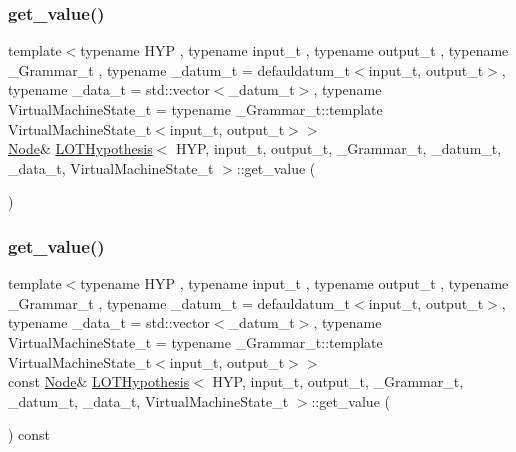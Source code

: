 \subsubsection{\texorpdfstring{get\+\_\+value()}{get\_value()}\hspace{0.1cm}{\footnotesize\ttfamily [1/2]}}
{\footnotesize\ttfamily template$<$typename H\+YP , typename input\+\_\+t , typename output\+\_\+t , typename \+\_\+\+Grammar\+\_\+t , typename \+\_\+datum\+\_\+t  = defauldatum\+\_\+t$<$input\+\_\+t, output\+\_\+t$>$, typename \+\_\+data\+\_\+t  = std\+::vector$<$\+\_\+datum\+\_\+t$>$, typename Virtual\+Machine\+State\+\_\+t  = typename \+\_\+\+Grammar\+\_\+t\+::template Virtual\+Machine\+State\+\_\+t$<$input\+\_\+t, output\+\_\+t$>$$>$ \\
\hyperlink{class_node}{Node}\& \hyperlink{class_l_o_t_hypothesis}{L\+O\+T\+Hypothesis}$<$ H\+YP, input\+\_\+t, output\+\_\+t, \+\_\+\+Grammar\+\_\+t, \+\_\+datum\+\_\+t, \+\_\+data\+\_\+t, Virtual\+Machine\+State\+\_\+t $>$\+::get\+\_\+value (\begin{DoxyParamCaption}{ }\end{DoxyParamCaption})\hspace{0.3cm}{\ttfamily [inline]}}

\mbox{\label{class_l_o_t_hypothesis_aea6cd096e4ea5967e9932475ecae472a}} 
\subsubsection{\texorpdfstring{get\+\_\+value()}{get\_value()}\hspace{0.1cm}{\footnotesize\ttfamily [2/2]}}
{\footnotesize\ttfamily template$<$typename H\+YP , typename input\+\_\+t , typename output\+\_\+t , typename \+\_\+\+Grammar\+\_\+t , typename \+\_\+datum\+\_\+t  = defauldatum\+\_\+t$<$input\+\_\+t, output\+\_\+t$>$, typename \+\_\+data\+\_\+t  = std\+::vector$<$\+\_\+datum\+\_\+t$>$, typename Virtual\+Machine\+State\+\_\+t  = typename \+\_\+\+Grammar\+\_\+t\+::template Virtual\+Machine\+State\+\_\+t$<$input\+\_\+t, output\+\_\+t$>$$>$ \\
const \hyperlink{class_node}{Node}\& \hyperlink{class_l_o_t_hypothesis}{L\+O\+T\+Hypothesis}$<$ H\+YP, input\+\_\+t, output\+\_\+t, \+\_\+\+Grammar\+\_\+t, \+\_\+datum\+\_\+t, \+\_\+data\+\_\+t, Virtual\+Machine\+State\+\_\+t $>$\+::get\+\_\+value (\begin{DoxyParamCaption}{ }\end{DoxyParamCaption}) const\hspace{0.3cm}{\ttfamily [inline]}}

